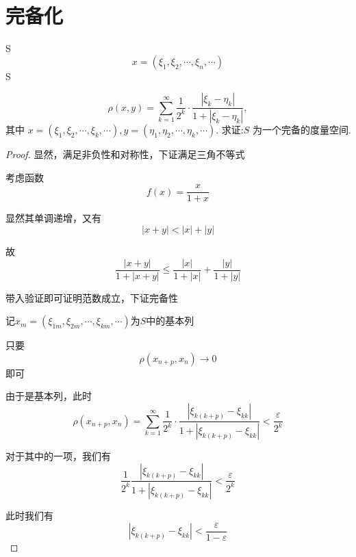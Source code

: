\documentclass[lang=cn,10pt]{elegantbook}
\begin{document}
	\section{完备化}
	\begin{exercise}
		
		S
		\begin{equation*}
			x=(\xi_1,\xi_2,\cdots,\xi_n,\cdots)
		\end{equation*}
		S
		
		\begin{equation*}
			\rho(x,y)=\sum_{k=1}^\infty\frac1{2^k}\cdot\frac{|\xi_k-\eta_k|}{1+|\xi_k-\eta_k|},
		\end{equation*}		
	$	\text{其中 }x=(\xi_1,\xi_2,\cdots,\xi_k,\cdots),y=(\eta_1,\eta_2,\cdots,\eta_k,\cdots).\text{ 求证:}S\text{ 为}\text{一个完备的度量空间}.$
	\end{exercise}
	\begin{proof}
		显然，满足非负性和对称性，下证满足三角不等式
		
		考虑函数
		\begin{equation*}
			f\left( x \right) =\frac{x}{1+x}
		\end{equation*}
		
		显然其单调递增，又有
		\begin{equation*}
			|x+y|<|x|+|y|
		\end{equation*}
		
		故
		\begin{equation*}
			\frac{|x+y|}{1+|x+y|}\le \frac{|x|}{1+|x|}+\frac{|y|}{1+|y|}
		\end{equation*}
		
		带入验证即可证明范数成立，下证完备性
		
		$\text{记}x_m=(\xi _{1m},\xi _{2m},\cdots ,\xi _{km},\cdots )$为$S$中的基本列
		
		只要
		\begin{equation*}
			\rho(x_{n+p},x_n)\rightarrow 0
		\end{equation*}
		即可
		
		由于是基本列，此时
		\begin{equation*}
			\rho (x_{n+p},x_n)=\sum_{k=1}^{\infty}{\frac{1}{2^k}}\cdot \frac{|\xi _{k\left( k+p \right)}-\xi _{kk}|}{1+|\xi _{k\left( k+p \right)}-\xi _{kk}|}<\frac{\varepsilon}{2^k}		
		\end{equation*}
		
		对于其中的一项，我们有
		\begin{equation*}
			\frac{1}{2^k}\frac{|\xi _{k\left( k+p \right)}-\xi _{kk}|}{1+|\xi _{k\left( k+p \right)}-\xi _{kk}|}<\frac{\varepsilon}{2^k}
		\end{equation*}
		
		此时我们有
		\begin{equation*}
			|\xi _{k\left( k+p \right)}-\xi _{kk}|<\frac{\varepsilon}{1-\varepsilon}
		\end{equation*}
		
		
	\end{proof}
\end{document}
